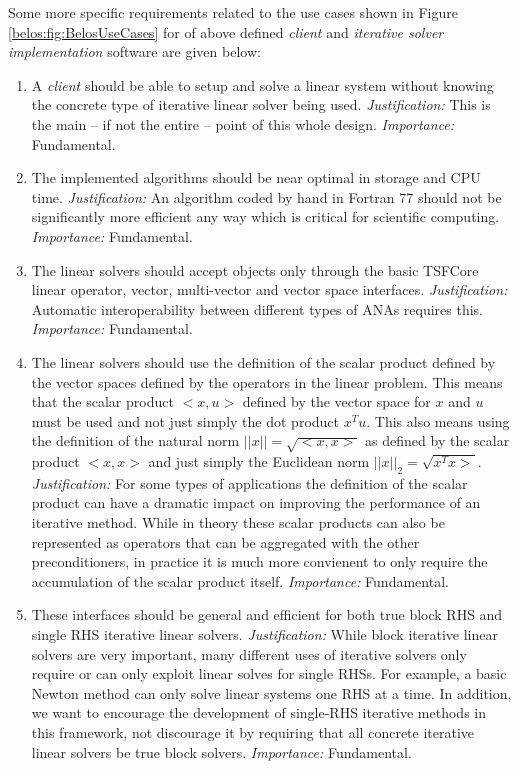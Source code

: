 \documentclass[pdf,ps2pdf,11pt]{SANDreport}
\begin{document}
Some more specific requirements related to the use cases shown in
Figure {}\ref{belos:fig:BelosUseCases} for of above defined
{}\textit{client} and {}\textit{iterative solver implementation}
software are given below:

\begin{enumerate}

\item
A {}\textit{client} should be able to setup and solve a linear system
without knowing the concrete type of iterative linear solver being
used.  {}\textit{Justification:} This is the main -- if not the entire
-- point of this whole design.  {}\textit{Importance:} Fundamental.

\item
The implemented algorithms should be near optimal in storage and CPU
time.  {}\textit{Justification:} An algorithm coded by hand in Fortran
77 should not be significantly more efficient any way which is
critical for scientific computing.  {}\textit{Importance:}
Fundamental.

\item
The linear solvers should accept objects only through the basic
TSFCore linear operator, vector, multi-vector and vector space
interfaces.  {}\textit{Justification:} Automatic interoperability
between different types of ANAs requires this.  {}\textit{Importance:}
Fundamental.

\item
The linear solvers should use the definition of the scalar product
defined by the vector spaces defined by the operators in the linear
problem.  This means that the scalar product $<x,u>$ defined by the
vector space for $x$ and $u$ must be used and not just simply the dot
product $x^T u$.  This also means using the definition of the natural
norm $||x|| = {}\sqrt{<x,x>}$ as defined by the scalar product $<x,x>$
and just simply the Euclidean norm $||x||_2 = \sqrt{x^T x>}$.
{}\textit{Justification:} For some types of applications the
definition of the scalar product can have a dramatic impact on
improving the performance of an iterative method.  While in theory
these scalar products can also be represented as operators that can be
aggregated with the other preconditioners, in practice it is much more
convienent to only require the accumulation of the scalar product
itself.  {}\textit{Importance:} Fundamental.

\item
These interfaces should be general and efficient for both true block
RHS and single RHS iterative linear solvers.
{}\textit{Justification:} While block iterative linear solvers are
very important, many different uses of iterative solvers only require
or can only exploit linear solves for single RHSs.  For example, a
basic Newton method can only solve linear systems one RHS at a time.
In addition, we want to encourage the development of single-RHS
iterative methods in this framework, not discourage it by requiring
that all concrete iterative linear solvers be true block solvers.
{}\textit{Importance:} Fundamental.


\end{enumerate}
\end{document}
